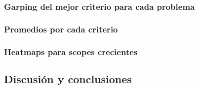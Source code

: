 \subsubsection{Garping del mejor criterio para cada problema}

\subsubsection{Promedios por cada criterio}

\subsubsection{Heatmaps para scopes crecientes}


\subsection{Discusión y conclusiones}


\newpage

